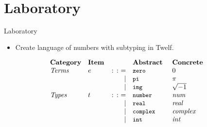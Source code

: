 \documentclass{beamer}
\begin{document}

\section{Laboratory}

\begin{frame}{Laboratory}
\begin{itemize}
\item Create language of numbers with subtyping in Twelf.
\end{itemize}
\[
\begin{array}{llrl@{\hspace{0.5cm}}l}
\mathbf{Category}   & \mathbf{Item}   & & \mathbf{Abstract} & \mathbf{Concrete} \\
\mathit{Terms}      & e & \bnfdef & \code{zero}                    & 0 \\
                    &   & \bnfalt & \code{pi}                      & \pi \\
                    &   & \bnfalt & \code{img}                     & \sqrt{-1} \\
\mathit{Types}      & t & \bnfdef & \code{number}                  & \textit{num} \\
                    &   & \bnfalt & \code{real}                    & \textit{real} \\
                    &   & \bnfalt & \code{complex}                 & \textit{complex} \\
                    &   & \bnfalt & \code{int}                     & \textit{int}
\end{array}
\]
\end{frame}
\end{document}
